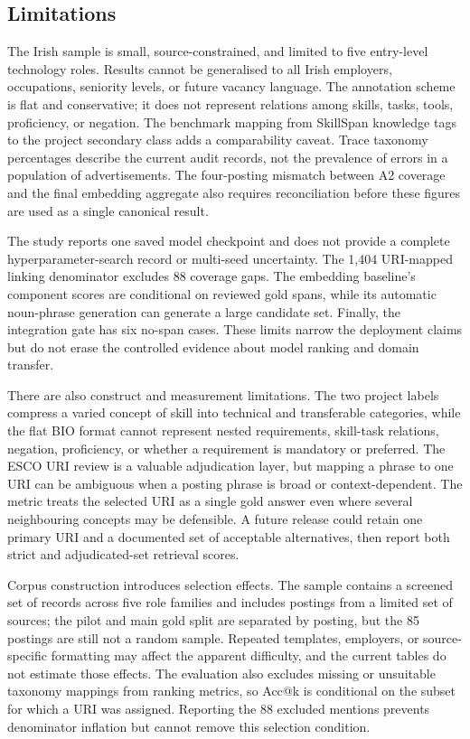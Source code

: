 \documentclass[conference]{IEEEtran}
\begin{document}
\subsection{Limitations}
The Irish sample is small, source-constrained, and limited to five entry-level technology roles. Results cannot be generalised to all Irish employers, occupations, seniority levels, or future vacancy language. The annotation scheme is flat and conservative; it does not represent relations among skills, tasks, tools, proficiency, or negation. The benchmark mapping from SkillSpan knowledge tags to the project secondary class adds a comparability caveat. Trace taxonomy percentages describe the current audit records, not the prevalence of errors in a population of advertisements. The four-posting mismatch between A2 coverage and the final embedding aggregate also requires reconciliation before these figures are used as a single canonical result.

The study reports one saved model checkpoint and does not provide a complete hyperparameter-search record or multi-seed uncertainty. The 1,404 URI-mapped linking denominator excludes 88 coverage gaps. The embedding baseline's component scores are conditional on reviewed gold spans, while its automatic noun-phrase generation can generate a large candidate set. Finally, the integration gate has six no-span cases. These limits narrow the deployment claims but do not erase the controlled evidence about model ranking and domain transfer.

There are also construct and measurement limitations. The two project labels compress a varied concept of skill into technical and transferable categories, while the flat BIO format cannot represent nested requirements, skill-task relations, negation, proficiency, or whether a requirement is mandatory or preferred. The ESCO URI review is a valuable adjudication layer, but mapping a phrase to one URI can be ambiguous when a posting phrase is broad or context-dependent. The metric treats the selected URI as a single gold answer even where several neighbouring concepts may be defensible. A future release could retain one primary URI and a documented set of acceptable alternatives, then report both strict and adjudicated-set retrieval scores.

Corpus construction introduces selection effects. The sample contains a screened set of records across five role families and includes postings from a limited set of sources; the pilot and main gold split are separated by posting, but the 85 postings are still not a random sample. Repeated templates, employers, or source-specific formatting may affect the apparent difficulty, and the current tables do not estimate those effects. The evaluation also excludes missing or unsuitable taxonomy mappings from ranking metrics, so Acc@k is conditional on the subset for which a URI was assigned. Reporting the 88 excluded mentions prevents denominator inflation but cannot remove this selection condition.
\end{document}
